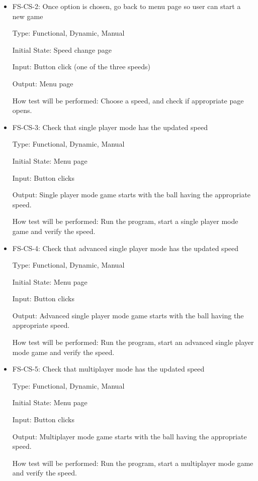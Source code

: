 \documentclass[12pt,letterpaper]{article}
\begin{document}
\begin{reqbox}
	\begin{itemize}
	\item FS-CS-2: Once option is chosen, go back to menu page so user can start a new game

	Type: Functional, Dynamic, Manual

	Initial State: Speed change page

	Input: Button click (one of the three speeds)	

	Output: Menu page

	How test will be performed: Choose a speed, and check if appropriate page opens.
	\end{itemize}
\end{reqbox}

\begin{reqbox}
	\begin{itemize}
	\item FS-CS-3: Check that single player mode has the updated speed

	Type: Functional, Dynamic, Manual

	Initial State: Menu page

	Input: Button clicks	

	Output: Single player mode game starts with the ball having the appropriate speed.

	How test will be performed: Run the program, start a single player mode game and verify the speed.
	\end{itemize}
\end{reqbox}

\begin{reqbox}
	\begin{itemize}
	\item FS-CS-4: Check that advanced single player mode has the updated speed

	Type: Functional, Dynamic, Manual

	Initial State: Menu page

	Input: Button clicks

	Output: Advanced single player mode game starts with the ball having the appropriate speed.

	How test will be performed: Run the program, start an advanced single player mode game and verify the speed.
	\end{itemize}
\end{reqbox}

\begin{reqbox}
	\begin{itemize}
	\item FS-CS-5: Check that multiplayer mode has the updated speed

	Type: Functional, Dynamic, Manual

	Initial State: Menu page

	Input: Button clicks

	Output: Multiplayer mode game starts with the ball having the appropriate speed.

	How test will be performed: Run the program, start a multiplayer mode game and verify the speed.
	\end{itemize}
\end{reqbox}
\end{document}

